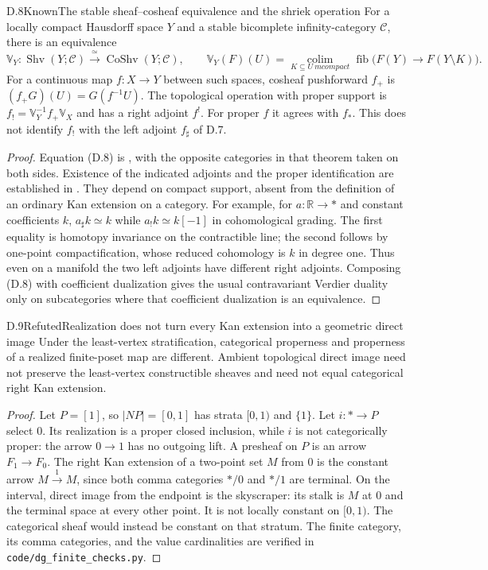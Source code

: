 \begin{claim}{D.8}{Known}{The stable sheaf--cosheaf equivalence and the shriek operation}
For a locally compact Hausdorff space $Y$ and a stable bicomplete
infinity-category $\mathcal C$, there is an equivalence
\[
 \mathbb V_Y:\operatorname{Shv}(Y;\mathcal C)
 \xrightarrow{\ \simeq\ }\operatorname{CoShv}(Y;\mathcal C),
 \qquad
 \mathbb V_Y(F)(U)=
 \operatorname*{colim}_{K\subseteq U\ {
m compact}}
 \operatorname{fib}\bigl(F(Y)\to F(Y\setminus K)\bigr).
\tag{D.8}
\]
For a continuous map $f:X\to Y$ between such spaces, cosheaf
pushforward $f_+$ is $(f_+G)(U)=G(f^{-1}U)$. The topological operation
with proper support is
$f_!=\mathbb V_Y^{-1}f_+\mathbb V_X$ and has a right adjoint $f^!$.
For proper $f$ it agrees with $f_*$. This does not identify $f_!$ with
the left adjoint $f_\sharp$ of D.7.
\end{claim}
\begin{proof}
Equation (D.8) is \citet[Theorem 5.5.5.1 and Proposition 5.5.5.10]{DGLurieHA},
with the opposite categories in that theorem taken on both sides.
Existence of the indicated adjoints and the proper identification are
established in \citet[Section 6.1]{DGVolpe2025}. They depend on
compact support, absent from the definition of an ordinary Kan
extension on a category. For example, for $a:\mathbb R\to *$ and
constant coefficients $k$, $a_\sharp k\simeq k$ while
$a_!k\simeq k[-1]$ in cohomological grading. The first equality is
homotopy invariance on the contractible line; the second follows by
one-point compactification, whose reduced cohomology is $k$ in
degree one. Thus even on a manifold the two left adjoints have
different right adjoints. Composing (D.8) with coefficient dualization
gives the usual contravariant Verdier duality only on subcategories
where that coefficient dualization is an equivalence.
\end{proof}

\begin{claim}{D.9}{Refuted}{Realization does not turn every Kan extension into a geometric direct image}
Under the least-vertex stratification, categorical properness and
properness of a realized finite-poset map are different. Ambient
topological direct image need not preserve the least-vertex
constructible sheaves and need not equal categorical right Kan
extension.
\end{claim}
\begin{proof}
Let $P=[1]$, so $|NP|=[0,1]$ has strata $[0,1)$ and $\{1\}$.
Let $i:*\to P$ select $0$. Its realization is a proper closed
inclusion, while $i$ is not categorically proper: the arrow $0\to1$
has no outgoing lift. A presheaf on $P$ is an arrow $F_1\to F_0$.
The right Kan extension of a two-point set $M$ from $0$ is the
constant arrow $M\xrightarrow{1}M$, since both comma categories
$*/0$ and $*/1$ are terminal. On the interval, direct image from
the endpoint is the skyscraper: its stalk is $M$ at $0$ and the
terminal space at every other point. It is not locally constant on
$[0,1)$. The categorical sheaf would instead be constant on that
stratum. The finite category, its comma categories, and the value
cardinalities are verified in \texttt{code/dg\_finite\_checks.py}.
\end{proof}

